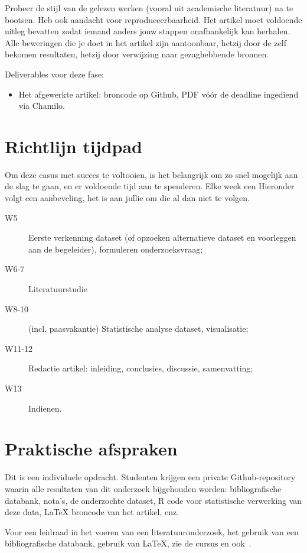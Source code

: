 \documentclass[fleqn,10pt]{voorstel}
\begin{document}
Probeer de stijl van de gelezen werken (vooral uit academische literatuur) na te bootsen. Heb ook aandacht voor reproduceerbaarheid. Het artikel moet voldoende uitleg bevatten zodat iemand anders jouw stappen onafhankelijk kan herhalen. Alle beweringen die je doet in het artikel zijn aantoonbaar, hetzij door de zelf bekomen resultaten, hetzij door verwijzing naar gezaghebbende bronnen.

Deliverables voor deze fase:

\begin{itemize}
  \item Het afgewerkte artikel: broncode op Github, PDF vóór de deadline ingediend via Chamilo.
\end{itemize}

\section{Richtlijn tijdpad}

Om deze casus met succes te voltooien, is het belangrijk om zo snel mogelijk aan de slag te gaan, en er voldoende tijd aan te spenderen. Elke week een  Hieronder volgt een aanbeveling, het is aan jullie om die al dan niet te volgen.

\begin{description}
  \item[W5] Eerste verkenning dataset (of opzoeken alternatieve dataset en voorleggen aan de begeleider), formuleren onderzoeksvraag;
  \item[W6-7] Literatuurstudie
  \item[W8-10] (incl. paasvakantie) Statistische analyse dataset, visualisatie;
  \item[W11-12] Redactie artikel: inleiding, conclusies, discussie, samenvatting;
  \item[W13] Indienen.
\end{description}

\section{Praktische afspraken}

Dit is een individuele opdracht. Studenten krijgen een private Github-repository waarin alle resultaten van dit onderzoek bijgehouden worden: bibliografische databank, nota's, de onderzochte dataset, R code voor statistische verwerking van deze data, {\LaTeX} broncode van het artikel, enz.

Voor een leidraad in het voeren van een literatuuronderzoek, het gebruik van een bibliografische databank, gebruik van \LaTeX{}, zie de cursus en ook~\autocite{VanVreckem2017}.
\end{document}
